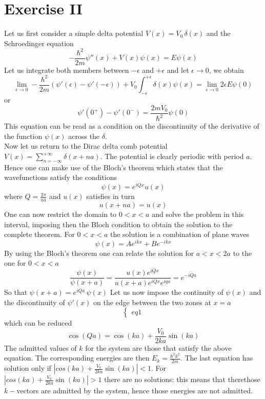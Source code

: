 \documentclass{article}
\begin{document}
\section{Exercise II}
Let us first consider a simple delta potential $V(x) = V_0 \, \delta(x)$ and the Schroedinger equation 
\begin{equation*}
    -\frac{\hbar^2}{2m}\psi''(x) + V(x) \psi(x) = E \psi(x)
\end{equation*}
Let us integrate both members between $-\epsilon$ and $+\epsilon$ and let $\epsilon \to 0$, we obtain 
\begin{equation*}
    \lim_{\epsilon \to 0} -\frac{\hbar^2}{2m} \left(\psi'(\epsilon) - \psi'(-\epsilon)\right) + V_0\int_{-\epsilon}^{+\epsilon} \delta(x) \psi(x) = \lim_{\epsilon \to 0} 2\epsilon E \psi(0)
\end{equation*} 
or 
\begin{equation*}
    \psi'(0^+) - \psi'(0^-) = \frac{2mV_0}{\hbar^2}\psi(0)
\end{equation*}
This equation can be read as a condition on the discontinuity of the derivative of the function $\psi(x)$ across the $\delta$. \\
Now let us return to the Dirac delta comb potential $V(x) = \sum_{n=-\infty}^{+\infty} \delta(x+na)$. The potential is clearly periodic with period $a$. Hence
one can make use of the Bloch's theorem which states that the wavefunctions satisfy the conditions
\begin{equation*}
    \psi(x) = e^{iQx} u(x)
\end{equation*}
where $Q=\frac{2\pi}{na}$ and $u(x)$ satisfies in turn
\begin{equation*}
    u(x+na) = u(x)
\end{equation*}
One can now restrict the domain to $0<x<a$ and solve the problem in this interval, imposing then the Bloch condition to obtain the solution 
to the complete theorem. For $0<x<a$ the solution is a combination of plane waves
\begin{equation*}
    \psi(x) = Ae^{ikx} + Be^{-ikx}
\end{equation*}
By using the Bloch's theorem one can relate the solution for $a<x<2a$ to the one for $0<x<a$
\begin{equation*}
    \frac{\psi(x)}{\psi(x+a)} = \frac{u(x)e^{iQx}}{u(x+a)e^{iQx}e^{iqa}} = e^{-iQa}
\end{equation*}
So that 
$\psi(x+a) = e^{iQa} \, \psi(x)$
Let us now impose the continuity of $\psi(x)$ and the discontinuity of $\psi'(x)$ on the edge between the two zones at $x=a$
$$\begin{cases}
    eq1
\end{cases}$$
which can be reduced
\begin{equation*}
    \cos(Qa) = \cos(ka) + \frac{V_0}{2ka} \sin(ka)
\end{equation*}
The admitted values of $k$ for the system are those that satisfy the above equation. The corresponding energies are then $E_k = \frac{\hbar^2k^2}{2m}$.
The last equation has solution only if $|cos(ka) + \frac{V_0}{2ka} \sin(ka)| < 1$. 
For $|cos(ka) + \frac{V_0}{2ka} \sin(ka)| > 1$ there are no solutions: this means that therethose $k-$vectors are admitted by the system, hence those energies are not admitted.
\end{document}
